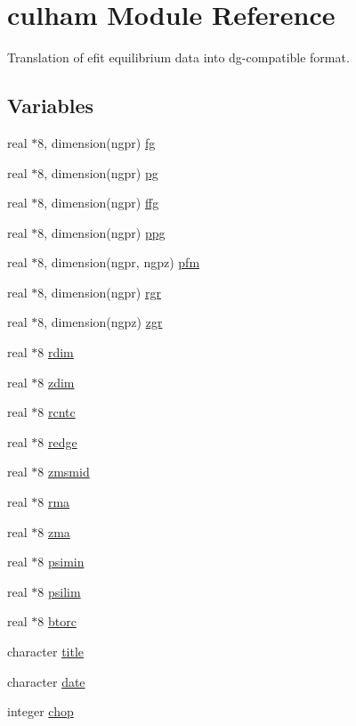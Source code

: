 \hypertarget{namespaceculham}{
\section{culham Module Reference}
\label{namespaceculham}
}
Translation of efit equilibrium data into dg-compatible format.  


\subsection*{Variables}
\begin{CompactItemize}
\item 
real $\ast$8, dimension(ngpr) \hyperlink{namespaceculham_eebfdf9a86b2f50ca0ec4b0df055cd58}{fg}
\item 
real $\ast$8, dimension(ngpr) \hyperlink{namespaceculham_debc8d3361a57d8b688866b6232f731c}{pg}
\item 
real $\ast$8, dimension(ngpr) \hyperlink{namespaceculham_806bc97fe7b18abe6b5946609135d94a}{ffg}
\item 
real $\ast$8, dimension(ngpr) \hyperlink{namespaceculham_395214ac6cbef35696c876fd56b18907}{ppg}
\item 
real $\ast$8, dimension(ngpr, ngpz) \hyperlink{namespaceculham_5d193536b9f85a25d4431dd85c1c4de6}{pfm}
\item 
real $\ast$8, dimension(ngpr) \hyperlink{namespaceculham_2cf8db6042d042662f5152bfd75688e1}{rgr}
\item 
real $\ast$8, dimension(ngpz) \hyperlink{namespaceculham_0fe5d01c9279056fcdb29700ac1642fd}{zgr}
\item 
real $\ast$8 \hyperlink{namespaceculham_ef180524d42fe683c14541e7315e32ef}{rdim}
\item 
real $\ast$8 \hyperlink{namespaceculham_3a2e93e29b6fdb2c74db87ba4970c103}{zdim}
\item 
real $\ast$8 \hyperlink{namespaceculham_24829ee796bd46efe1c8987c323136f4}{rcntc}
\item 
real $\ast$8 \hyperlink{namespaceculham_a03f34fd140fa9f55078c495f874f2f9}{redge}
\item 
real $\ast$8 \hyperlink{namespaceculham_1fb71c104f13bac55811277b4fecdb55}{zmsmid}
\item 
real $\ast$8 \hyperlink{namespaceculham_262f15ecbe6c9fb9d128a5d1e1f7ab8b}{rma}
\item 
real $\ast$8 \hyperlink{namespaceculham_7be4069ba1270e1795cc36ebd2dc0a70}{zma}
\item 
real $\ast$8 \hyperlink{namespaceculham_d928d97ed9e2567e915c0c261b8a331e}{psimin}
\item 
real $\ast$8 \hyperlink{namespaceculham_5aa2b255c3d1667ed12833d5f1d466a7}{psilim}
\item 
real $\ast$8 \hyperlink{namespaceculham_d9d2dc032faaf706475d267fde4cbd90}{btorc}
\item 
character \hyperlink{namespaceculham_16e7734b25610633d7174a8355319804}{title}
\item 
character \hyperlink{namespaceculham_851b9b19eaa7d3a62c22962b9f86597d}{date}
\item 
integer \hyperlink{namespaceculham_cf77cb461114f1c1ef92e565a814b1ae}{chop}
\end{CompactItemize}


